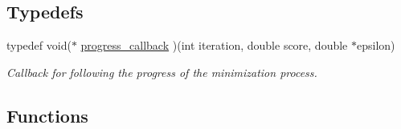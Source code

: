 \subsection*{Typedefs}
\begin{DoxyCompactItemize}
\item 
typedef void($\ast$ \hyperlink{group__soft__constraints_gafd57325a0fa4307cd72f933107f9d493}{progress\-\_\-callback} )(int iteration, double score, double $\ast$epsilon)
\begin{DoxyCompactList}\small\item\em Callback for following the progress of the minimization process. \end{DoxyCompactList}\end{DoxyCompactItemize}
\subsection*{Functions}
